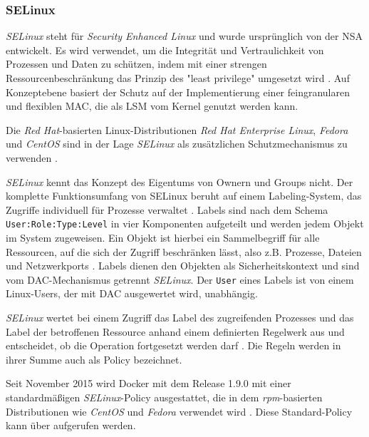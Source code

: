 \documentclass[../main.tex]{subfiles}
\begin{document}
  		\subsubsection{\acrshort{SELinux}}
				\emph{SELinux} steht für \emph{Security Enhanced Linux} und wurde ursprünglich von der NSA entwickelt. Es wird verwendet, um die Integrität und Vertraulichkeit von Prozessen und Daten zu schützen, indem mit einer strengen Ressourcenbeschränkung das Prinzip des "least privilege" umgesetzt wird  \cite{redhatSec}. %
				Auf Konzeptebene basiert der Schutz auf der Implementierung einer feingranularen und flexiblen MAC, die als LSM vom Kernel genutzt werden kann.

				Die \emph{Red Hat}-basierten Linux-Distributionen \emph{Red Hat Enterprise Linux}, \emph{Fedora} und \emph{CentOS} sind in der Lage \emph{SELinux} als zusätzlichen Schutzmechanismus zu verwenden \cite{dockerSecurity}.

				\emph{SELinux} kennt das Konzept des Eigentums von Ownern und Groups nicht. Der komplette Funktionsumfang von SELinux beruht auf einem Labeling-System, das Zugriffe individuell für Prozesse verwaltet \cite{SELinuxComic}. Labels sind nach dem Schema \texttt{User:Role:Type:Level} in vier Komponenten aufgeteilt und werden jedem Objekt im System zugeweisen. Ein Objekt ist hierbei ein Sammelbegriff für alle Ressourcen, auf die sich der Zugriff beschränken lässt, also z.B. Prozesse, Dateien und Netzwerkports \cite{atomicDockerSELinux}. Labels dienen den Objekten als Sicherheitskontext und sind vom DAC-Mechanismus getrennt \emph{SELinux}. Der \texttt{User} eines Labels ist von einem Linux-Users, der mit DAC ausgewertet wird, unabhängig.

				\emph{SELinux} wertet bei einem Zugriff das Label des zugreifenden Prozesses und das Label der betroffenen Ressource anhand einem definierten Regelwerk aus und entscheidet, ob die Operation fortgesetzt werden darf \cite{linuxSecOverview}. Die Regeln werden in ihrer Summe auch als Policy bezeichnet.

				Seit November 2015 wird Docker mit dem Release 1.9.0 mit einer standardmäßigen \emph{SELinux}-Policy ausgestattet, die in dem \emph{rpm}-basierten Distributionen wie \emph{CentOS} und \emph{Fedora} verwendet wird \cite{githubDockerChangelog}\cite{githubSELinuxPolicyIssue}. Diese Standard-Policy kann über \cite{githubSELinuxProfile} aufgerufen werden.
\end{document}
